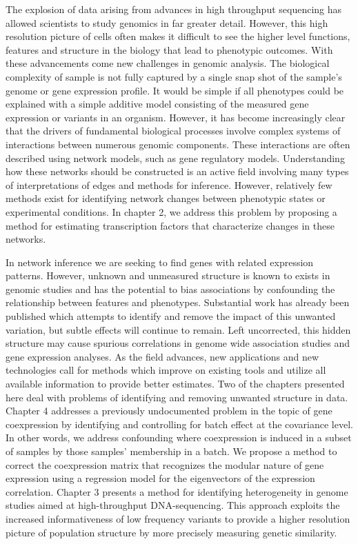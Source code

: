 
The explosion of data arising from advances in high throughput sequencing has allowed scientists to study genomics in far greater detail.  However, this high resolution picture of cells often makes it difficult to see the higher level functions, features and structure in the biology that lead to phenotypic outcomes.  With these advancements come new challenges in genomic analysis. The biological complexity of sample is not fully captured by a single snap shot of the sample's genome or gene expression profile. It would be simple if all phenotypes could be explained with a simple additive model consisting of the measured gene expression or variants in an organism.  However, it has become increasingly clear that the drivers of fundamental biological processes involve complex systems of interactions between numerous genomic components.  These interactions are often described using network models, such as gene regulatory models.  Understanding how these networks should be constructed is an active field involving many types of interpretations of edges and methods for inference. However, relatively few methods exist for identifying network changes between phenotypic states or experimental conditions.  In chapter 2, we address this problem by proposing a method for estimating transcription factors that characterize changes in these networks.

In network inference we are seeking to find genes with related expression patterns. However, unknown and unmeasured structure is known to exists in genomic studies and has the potential to bias associations by confounding the relationship between features and phenotypes. Substantial work has already been published which attempts to identify and remove the impact of this unwanted variation, but subtle effects will continue to remain. Left uncorrected, this hidden structure may cause spurious correlations in genome wide association studies and gene expression analyses. As the field advances, new applications and new technologies call for methods which improve on existing tools and utilize all available information to provide better estimates.  Two of the chapters presented here deal with problems of identifying and removing unwanted structure in data. Chapter 4 addresses a previously undocumented problem in the topic of gene coexpression by identifying and controlling for batch effect at the covariance level. In other words, we address confounding where coexpression is induced in a subset of samples by those samples' membership in a batch. We propose a method to correct the coexpression matrix that recognizes the modular nature of gene expression using a regression model for the eigenvectors of the expression correlation. Chapter 3 presents a method for identifying heterogeneity in genome studies aimed at high-throughput DNA-sequencing. This approach exploits the increased informativeness of low frequency variants to provide a higher resolution picture of population structure by more precisely measuring genetic similarity.
